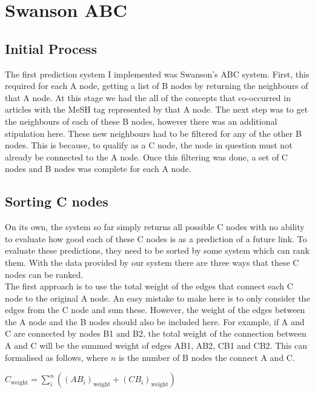 \documentclass{l4proj}
\begin{document}
\section{Swanson ABC}

\subsection{Initial Process}

The first prediction system I implemented was Swanson's ABC system. First, this required for each A node, getting a list of B nodes by returning the neighbours of that A node. At this stage we had the all of the concepts that co-occurred in articles with the MeSH tag represented by that A node. The next step was to get the neighbours of each of these B nodes, however there was an additional stipulation here. These new neighbours had to be filtered for any of the other B nodes. This is because, to qualify as a C node, the node in question must not already be connected to the A node. Once this filtering was done, a set of C nodes and B nodes was complete for each A node. \\

\subsection{Sorting C nodes}

On its own, the system so far simply returns all possible C nodes with no ability to evaluate how good each of these C nodes is as a prediction of a future link. To evaluate these predictions, they need to be sorted by some system which can rank them. With the data provided by our system there are three ways that these C nodes can be ranked. \\

The first approach is to use the total weight of the edges that connect each C node to the original A node. An easy mistake to make here is to only consider the edges from the C node and sum these. However, the weight of the edges between the A node and the B nodes should also be included here. For example, if A and C are connected by nodes B1 and B2, the total weight of the connection between A and C will be the summed weight of edges AB1, AB2, CB1 and CB2. This can formalised as follows, where $n$ is the number of B nodes the connect A and C.
\begin{center}
    $C_{\text{weight}} = \sum_i^n ((AB_i)_{\text{weight}} + (CB_i)_{\text{weight}})$ \\
\end{center}
\end{document}
